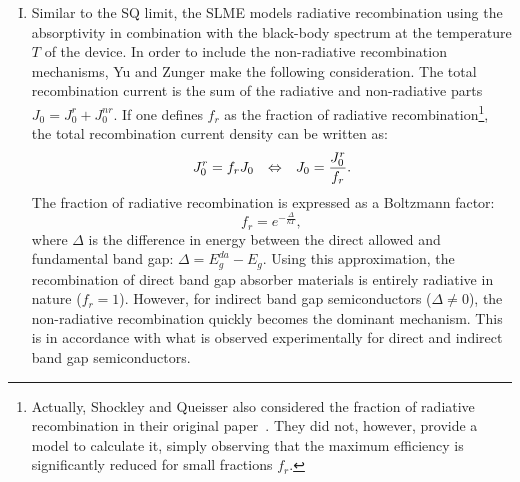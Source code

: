 \begin{refsection}
\begin{enumerate}[I.]
\item Similar to the SQ limit, the SLME models radiative recombination using the absorptivity in 
combination with the black-body spectrum at the temperature $T$ of the device. 
In order to include the non-radiative recombination mechanisms, Yu and Zunger 
make the following consideration. The total recombination current is the 
sum of the radiative and non-radiative parts $J_0 = J_0^r + J_0^{nr}$. If one 
defines $f_r$ as the fraction of radiative recombination\footnote{Actually, 
Shockley and Queisser also considered the fraction of radiative recombination 
in their original paper~\cite{Shockley1961}. They did not, however, provide a model to calculate it, 
simply observing that the maximum efficiency is significantly reduced for 
small fractions $f_r$.}, the total recombination current density can be 
written as: 
\begin{equation} 
J_0^r = f_r J_0 \hspace{0.1in} \Leftrightarrow \hspace{0.1in} J_0 = 
\frac{J_0^r}{f_r}. 
\end{equation} 
The fraction of radiative recombination is expressed as a Boltzmann factor:  
\begin{equation} \label{slme:eq-fraction} 
f_r = e^{-\frac{\Delta}{kT}}, 
\end{equation} 
where $\Delta$ is the difference in energy between the direct allowed and 
fundamental band gap: $\Delta = E_g^{da} - E_g$. Using this approximation, the 
recombination of direct band gap absorber materials is entirely radiative in 
nature ($f_r = 1$). However, for indirect band gap semiconductors ($\Delta 
\neq 0$), the non-radiative recombination quickly becomes the dominant 
mechanism. This is in accordance with what is observed experimentally for 
direct and indirect band gap semiconductors. 
\end{enumerate} 
\vspace{0.1in} 
 

\end{refsection}
